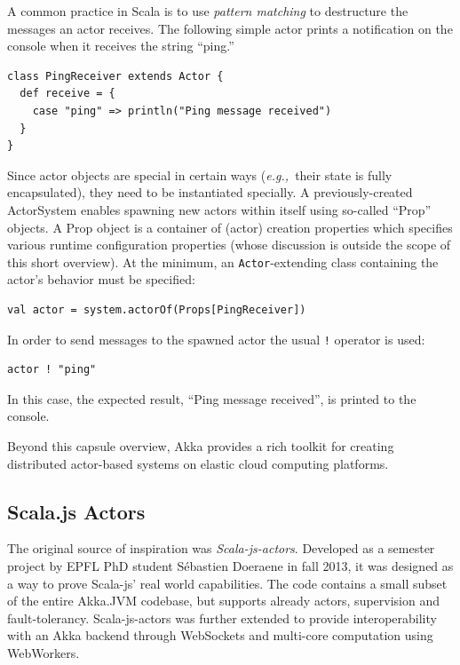 \documentclass{sig-alternate}
\newcommand{\eg}{{\em e.g.,~}}
\begin{document}
A common practice in Scala is to use {\em pattern matching} to destructure the messages an actor receives. The following simple actor prints a notification on the console when it receives the string ``ping.''
\begin{lstlisting}
class PingReceiver extends Actor {
  def receive = {
    case "ping" => println("Ping message received")
  }
}
\end{lstlisting}
\noindent
Since actor objects are special in certain ways (\eg their state is fully encapsulated), they need to be instantiated specially. A previously-created ActorSystem enables spawning new actors within itself using so-called ``Prop'' objects. A Prop object is a container of (actor) creation properties which specifies various runtime configuration properties (whose discussion is outside the scope of this short overview). At the minimum, an \verb|Actor|-extending class containing the actor's behavior must be specified:
\begin{lstlisting}
val actor = system.actorOf(Props[PingReceiver])
\end{lstlisting}
\noindent
In order to send messages to the spawned actor the usual \verb|!| operator is used:
\begin{lstlisting}
actor ! "ping"
\end{lstlisting}
\noindent
In this case, the expected result, ``Ping message received'', is printed to the console.

Beyond this capsule overview, Akka provides a rich toolkit for creating distributed actor-based systems on elastic cloud computing platforms.


\subsection{Scala.js Actors}

The original source of inspiration was \textit{Scala-js-actors}.
Developed as a semester project by EPFL PhD student Sébastien Doeraene in fall 2013, it was designed as a way to prove Scala-js' real world capabilities.
The code contains a small subset of the entire Akka.JVM codebase, but supports already actors, supervision and fault-tolerancy.
Scala-js-actors was further extended to provide interoperability with an Akka backend through WebSockets and multi-core computation using WebWorkers.
\end{document}
